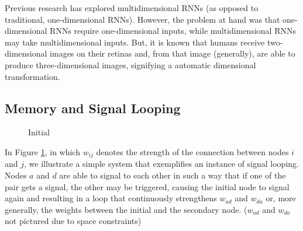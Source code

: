 \documentclass[12pt]{article}
\begin{document}
Previous research has explored multidimensional RNNs \cite{dimensionalrnn} (as opposed to traditional, one-dimensional RNNs).  However, the problem at hand was that one-dimensional RNNs require one-dimensional inputs, while multidimensional RNNs may take multidimensional inputs.  But, it is known that humans receive two-dimensional images on their retinas and, from that image (generally), are able to produce three-dimensional images, signifying a automatic dimensional transformation.

\subsection{Memory and Signal Looping} \label{looping}

\begin{figure}[H]
    \centering
    \caption{Initial} \label{fig:initial-signal-loop}
\end{figure}

In Figure \ref{fig:initial-signal-loop}, in which $w_{ij}$ denotes the strength of the connection between nodes $i$ and $j$, we illustrate a simple system that exemplifies an instance of signal looping.  Nodes $a$ and $d$ are able to signal to each other in such a way that if one of the pair gets a signal, the other may be triggered, causing the initial node to signal again and resulting in a loop that continuously strengthens $w_{ad}$ and $w_{da}$ or, more generally, the weights between the initial and the secondary node. ($w_{ad}$ and $w_{da}$ not pictured due to space constraints)
\end{document}
